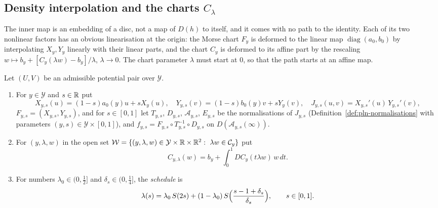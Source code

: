 \subsection{Density interpolation and the charts \texorpdfstring{$C_\lambda$}{C-lambda}}\label{sec:pln-charts}

The inner map is an embedding of a disc, not a map of $D(h)$ to itself, and it comes with no path to the
identity. Each of its two nonlinear factors has an obvious linearisation at the origin: the Morse chart
$F_y$ is deformed to the linear map $\operatorname{diag}(a_0,b_0)$ by interpolating $X_y,Y_y$ linearly with their
linear parts, and the chart $C_y$ is deformed to its affine part by the rescaling
$w\mapsto b_y+[C_y(\lambda w)-b_y]/\lambda$, $\lambda\to0$. The chart parameter $\lambda$ must start at $0$, so that
the path starts at an affine map.

\begin{definition}\label{def:pln-charts}
Let $(U,V)$ be an admissible potential pair over $\mathcal Y$.
\begin{enumerate}[label=(\alph*)]
\item For $y\in\mathcal Y$ and $s\in\mathbb{R}$ put
 \[
  X_{y,s}(u)=(1-s)a_0(y)u+sX_y(u),\quad Y_{y,s}(v)=(1-s)b_0(y)v+sY_y(v),\quad
  J_{y,s}(u,v)=X_{y,s}'(u)\,Y_{y,s}'(v),
 \]
 $F_{y,s}=(X_{y,s},Y_{y,s})$, and for $s\in[0,1]$ let $T_{y,s}$, $D_{y,s}$, $\mathcal A_{y,s}$, $E_{y,s}$ be the
 normalisations of $J_{y,s}$ (Definition~\ref{def:pln-normalisations} with parameters $(y,s)\in\mathcal Y\times[0,1]$),
 and $f_{y,s}=F_{y,s}\circ T_{y,s}^{-1}\circ D_{y,s}$ on $D(\mathcal A_{y,s}(\infty))$.
\item For $(y,\lambda,w)$ in the open set $\mathcal W=\{(y,\lambda,w)\in\mathcal Y\times\mathbb{R}\times\mathbb{R}^2:\ \lambda w\in\mathcal C_y\}$ put
 \[
  C_{y,\lambda}(w)=b_y+\int_0^1DC_y(t\lambda w)\,w\,dt .
 \]
\item For numbers $\lambda_0\in(0,\frac12]$ and $\delta_s\in(0,\frac14]$, the \emph{schedule} is
 \[
  \lambda(s)=\lambda_0\,S(2s)+(1-\lambda_0)\,S\Bigl(\frac{s-1+\delta_s}{\delta_s}\Bigr),\qquad s\in[0,1].
 \]
\end{enumerate}
\end{definition}

